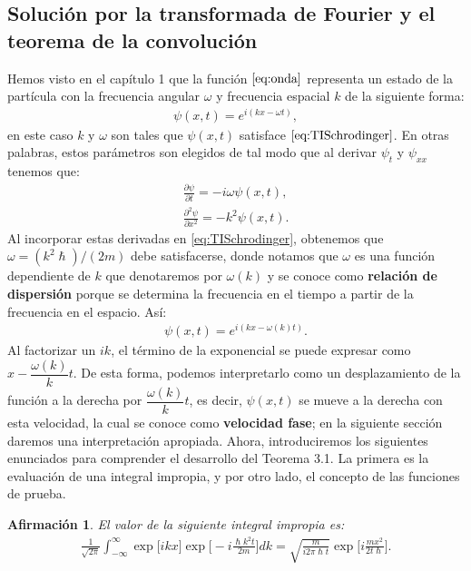 \documentclass[12pt]{article}
\newtheorem{afirm}[teo]{Afirmación}
\theoremstyle{definition}
\begin{document}
\subsection{Solución por la transformada de Fourier y el teorema de la convolución}
\noindent
Hemos visto en el capítulo 1 que la función $\eqref{eq:onda}$ representa un estado de la partícula con la frecuencia angular $\omega$ y frecuencia espacial $k$ de la siguiente forma:
\begin{align*}
    \psi(x,t) = e^{i(kx - \omega t)},
\end{align*}
en este caso $k$ y $\omega$ son tales que $\psi(x,t)$ satisface $\eqref{eq:TISchrodinger}$. En otras palabras, estos parámetros son elegidos de tal modo que al derivar $\psi_{t}$ y $\psi_{xx}$ tenemos que:
\begin{align*}
    \frac{\partial\psi}{\partial t} = -i\omega\psi(x,t) ,\\
    \frac{\partial^2\psi}{\partial x^2} = -k^2\psi(x,t).
\end{align*}
Al incorporar estas derivadas en \eqref{eq:TISchrodinger}, obtenemos que $\omega = (k^2\hslash)/(2m)$ debe satisfacerse, donde notamos que $\omega$ es una función dependiente de $k$ que denotaremos por $\omega(k)$ y se conoce como \textbf{relación de dispersión} porque se determina la frecuencia en el tiempo a partir de la frecuencia en el espacio. Así:
\begin{align*}
    \psi(x,t) = e^{i(kx-\omega(k)t)}.
\end{align*}
Al factorizar un $ik$, el término de la exponencial se puede expresar como $x - \dfrac{\omega(k)}{k}t$. De esta forma, podemos interpretarlo como un desplazamiento de la función a la derecha por $\dfrac{\omega(k)}{k}t$, es decir, $\psi(x,t)$ se mueve a la derecha con esta velocidad, la cual se conoce como \textbf{velocidad fase}; en la siguiente sección daremos una interpretación apropiada. 
Ahora, introduciremos los siguientes enunciados para comprender el desarrollo del Teorema 3.1. La primera es la evaluación de una integral impropia, y por otro lado, el concepto de las funciones de prueba. 
\begin{afirm}
    El valor de la siguiente integral impropia es:
    \begin{align}
       \frac{1}{\sqrt{2\pi}}\int_{-\infty}^{\infty}\exp\big[ikx\big]\exp\bigg[-i\frac{\hslash k^2t}{2m}\bigg]dk = \sqrt{\frac{m}{i2\pi\hslash t}}\exp\bigg[i\frac{mx^2}{2t\hslash}\bigg].
       \label{eq:Impropia}
    \end{align}  
\end{afirm}
\end{document}
